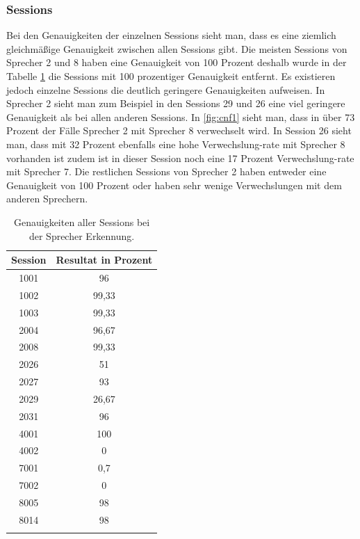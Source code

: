 \subsubsection{Sessions}
Bei den Genauigkeiten der einzelnen Sessions sieht man, dass es eine ziemlich gleichmäßige Genauigkeit zwischen allen Sessions gibt. Die meisten Sessions von Sprecher 2 und 8 haben eine Genauigkeit von 100 Prozent deshalb wurde in der Tabelle \ref{tab:UnfSessions} die Sessions mit 100 prozentiger Genauigkeit entfernt. Es existieren jedoch einzelne Sessions die deutlich geringere Genauigkeiten aufweisen. In Sprecher 2 sieht man zum Beispiel in den Sessions 29 und 26 eine viel geringere Genauigkeit als bei allen anderen Sessions. In \ref{fig:cnf1} sieht man, dass in über 73 Prozent der Fälle Sprecher 2 mit Sprecher 8 verwechselt wird. In Session 26 sieht man, dass mit 32 Prozent ebenfalls eine hohe Verwechslung-rate mit Sprecher 8 vorhanden ist zudem ist in dieser Session noch eine 17 Prozent Verwechslung-rate mit Sprecher 7. Die restlichen Sessions von Sprecher 2 haben entweder eine Genauigkeit von 100 Prozent oder haben sehr wenige Verwechslungen mit dem anderen Sprechern.

\begin{table}[H]
 \centering
 \caption{Genauigkeiten aller Sessions bei der Sprecher Erkennung.}
\begin{tabular}{|c|c|}
\hline 
Session & Resultat in Prozent \\ 
\hline 
1001 & 96 \\ 
\hline 
1002 & 99,33 \\ 
\hline 
1003 & 99,33 \\ 
\hline 
2004 & 96,67 \\ 
\hline 
2008 & 99,33 \\ 
\hline 
2026 & 51 \\ 
\hline 
2027 & 93 \\ 
\hline 
2029 & 26,67 \\ 
\hline 
2031 & 96 \\ 
\hline 
4001 & 100 \\ 
\hline 
4002 & 0 \\ 
\hline 
7001 & 0,7 \\ 
\hline 
7002 & 0 \\ 
\hline 
8005 & 98 \\ 
\hline 
8014 & 98 \\ 
\hline
\label{tab:UnfSessions} 
\end{tabular} 
\end{table}
  

